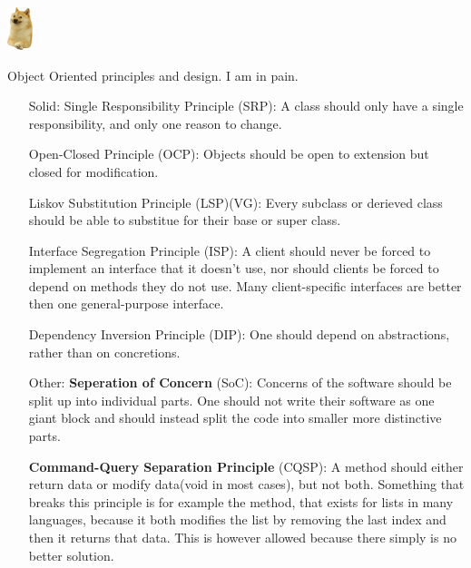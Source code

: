 \documentclass{article}
\begin{document}
\includegraphics[width=2em]{2ljhyisqtna51.png}
\begin{center}
    \vspace*{\fill}
    {\Huge Object Oriented principles and design.}\newline
    {\small I am in pain.}
    \vspace*{\fill}
\end{center}
\newpage

\begin{enumerate}
    \item[\huge{Solid:}]
          {\huge S}ingle Responsibility Principle (SRP):\newline
          A class should only have a single responsibility, and only one reason to change.

              {\huge O}pen-Closed Principle (OCP):\newline
          Objects should be open to extension but closed for modification.

              {\huge L}iskov Substitution Principle (LSP)(VG):\newline
          Every subclass or derieved class should be able to substitue
          for their base or super class.

              {\huge I}nterface Segregation Principle (ISP):\newline
          A client should never be forced to implement an interface that it doesn't use, nor
          should clients be forced to depend on methods they do not use. Many
          client-specific interfaces are better then one general-purpose interface.

              {\huge D}ependency Inversion Principle (DIP):\newline
          One should depend on abstractions, rather than on concretions.

    \item[\huge Other:]
          \textbf{Seperation of Concern} (SoC):\newline
          Concerns of the software should be split up into individual parts.
          One should not write their software as one giant block and should instead
          split the code into smaller more distinctive parts.

          \textbf{Command-Query Separation Principle} (CQSP):\newline
          A method should either return data or modify data(void in most cases),
          but not both.\newline
          Something that breaks this principle is for example the  method, that
          exists for lists in many languages, because it both modifies the list by removing
          the last index and then it returns that data. This is however allowed because there
          simply is no better solution.


\end{enumerate}
\end{document}
